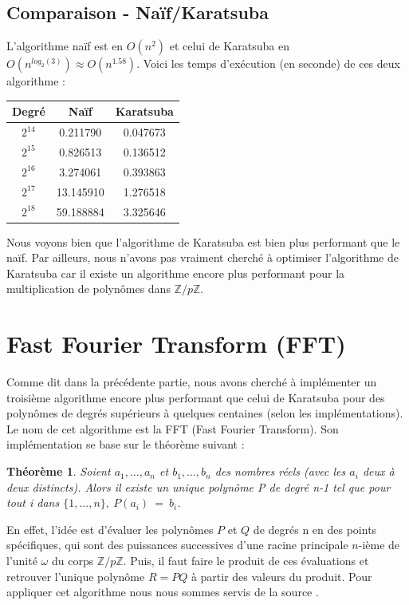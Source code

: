 \documentclass[12pt, a4paper]{article}
\begin{document}
\subsection{Comparaison - Naïf/Karatsuba}
L'algorithme naïf est en $O(n^2)$ et celui de Karatsuba en $O(n^{log_2(3)}) \approx O(n^{1.58})$. Voici les temps d'exécution (en seconde) de ces deux algorithme :

\begin{center}
\begin{tabular}{||c c c||}
\hline
Degré & Naïf & Karatsuba \\
\hline\hline
$2^{14}$ & 0.211790 & 0.047673 \\
\hline
$2^{15}$ & 0.826513 & 0.136512 \\
\hline
$2^{16}$ & 3.274061 & 0.393863 \\
\hline
$2^{17}$ & 13.145910 & 1.276518 \\
\hline
$2^{18}$ & 59.188884 & 3.325646 \\
\hline
\end{tabular}
\end{center}

Nous voyons bien que l'algorithme de Karatsuba est bien plus performant que le naïf. Par ailleurs, nous n'avons pas vraiment cherché à optimiser l'algorithme de Karatsuba car il existe un algorithme encore plus performant pour la multiplication de polynômes dans $\mathbb{Z}/p\mathbb{Z}$.

\section{Fast Fourier Transform (FFT)}

Comme dit dans la précédente partie, nous avons cherché à implémenter un troisième algorithme encore plus performant que celui de Karatsuba pour des polynômes de degrés supérieurs à quelques centaines (selon les implémentations). Le nom de cet algorithme est la FFT (Fast Fourier Transform). Son implémentation se base sur le théorème suivant :

\newtheorem{Thm1}{Théorème}
\begin{Thm1}
Soient $a_1,\dots,a_n$ et $b_1,\dots,b_n$ des nombres réels (avec les $a_i$ deux à deux distincts). Alors il existe un unique polynôme P de degré n-1 tel que pour tout i dans $\{1,..., n\},\ P(a_i)\ =\ b_i$.
\end{Thm1}

En effet, l’idée est d’évaluer les polynômes $P$ et $Q$ de degrés n en des points spécifiques, qui sont des puissances successives d'une racine principale $n$-ième de l'unité $\omega$ du corps $\mathbb{Z}/p\mathbb{Z}$. Puis, il faut faire le produit de ces évaluations et retrouver l’unique polynôme $R=PQ$ à partir des valeurs du produit. Pour appliquer cet algorithme nous nous sommes servis de la source \cite{AECF}. \\
 
\end{document}
